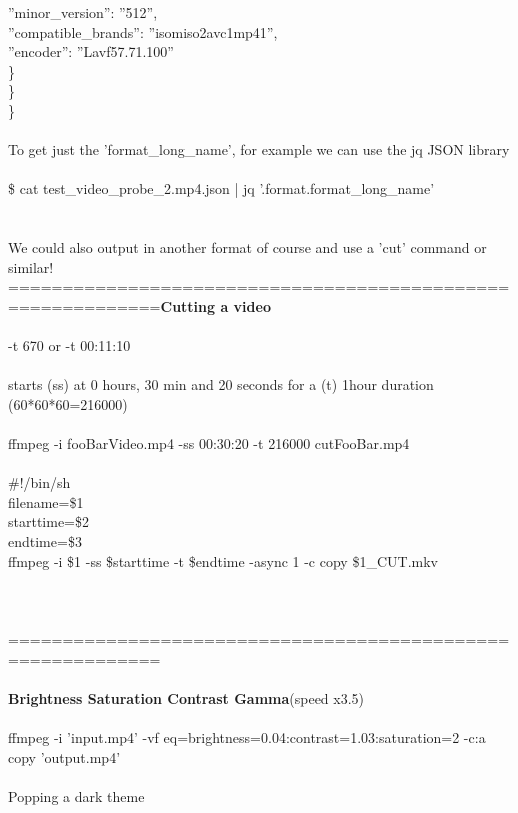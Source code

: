 \documentclass[10pt,a4paper]{article}
\begin{document}
{{{{{{{{{{{{{{            ''minor\_version'': ''512'',\\
            ''compatible\_brands'': ''isomiso2avc1mp41'',\\
            ''encoder'': ''Lavf57.71.100''\\
        \}\\
    \}\\
\}}{\Large \\
\\
To get just the 'format\_long\_name', for example we can use the jq JSON library\\
\\
\$ cat test\_video\_probe\_2.mp4.json | jq '.format.format\_long\_name'\\
\\
\\
We could also output in another format of course and use a 'cut' command or similar!\\
============================================================{\large }}{\Large \textbf{Cutting a video }}{\Large \\
\\
-t 670 		or 		-t 00:11:10 \\
\\
starts (ss) at 0 hours, 30 min and 20 seconds for a (t) 1hour duration (60*60*60=216000)\\
\\
ffmpeg -i fooBarVideo.mp4 -ss 00:30:20 -t 216000 cutFooBar.mp4\\
}{\large }{\Large \\
\#!/bin/sh\\
filename=\$1\\
starttime=\$2\\
endtime=\$3\\
ffmpeg -i \$1 -ss \$starttime -t \$endtime -async 1 -c copy \$1\_CUT.mkv\\
\\
\\
\\
============================================================\\
\\
\textbf{Brightness Saturation Contrast  Gamma}}{\Large  (speed x3.5)\\
\\
ffmpeg -i 'input.mp4' -vf eq=brightness=0.04:contrast=1.03:saturation=2 -c:a copy 'output.mp4'\\
\\
Popping a dark theme\\
}}}}}}}}}}}}}}
\end{document}
